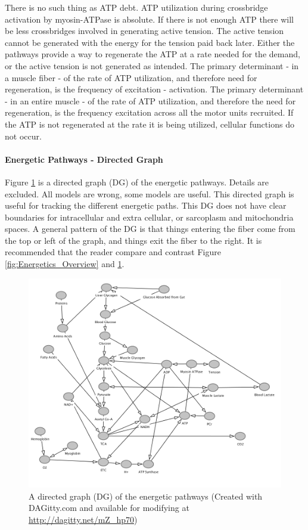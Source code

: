 There is no such thing as ATP debt. ATP utilization during crossbridge activation by myosin-ATPase is absolute. If there is not enough ATP there will be less crossbridges involved in generating active tension. The active tension cannot be generated with the energy for the tension paid back later. Either the pathways provide a way to regenerate the ATP at a rate needed for the demand, or the active tension is not generated as intended. The primary determinant - in a muscle fiber - of the rate of ATP utilization, and therefore need for regeneration, is the frequency of excitation - activation. The primary determinant - in an entire muscle - of the rate of ATP utilization, and therefore the need for regeneration, is the frequency excitation across all the motor units recruited. If the ATP is not regenerated at the rate it is being utilized, cellular functions do not occur. 

\paragraph{Energetic Pathways - Directed Graph}

Figure \ref{fig:energetic_paths} is a directed graph (DG) of the energetic pathways. Details are excluded. All models are wrong, some models are useful. This directed graph is useful for tracking the different energetic paths. This DG does not have clear boundaries for intracellular and extra cellular, or sarcoplasm and mitochondria spaces. A general pattern of the DG is that things entering the fiber come from the top or left of the graph, and things exit the fiber to the right. It is recommended that the reader compare and contrast Figure \ref{fig:Energetics_Overview} and \ref{fig:energetic_paths}. 

\begin{figure}[!h]
    \centering
    \includegraphics[width=1\linewidth]{./figure/energetic_paths.png}
    \caption{A directed graph (DG) of the energetic pathways (\footnotesize{Created with DAGitty.com and available for modifying at \url{http://dagitty.net/mZ_hp70}})}
    \label{fig:energetic_paths}
\end{figure}

